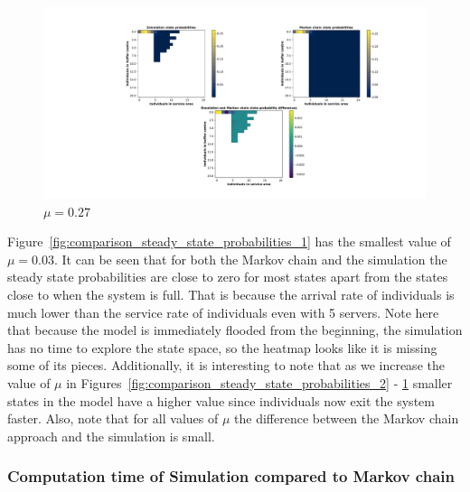 \begin{figure}[H]
    \includegraphics[width=\textwidth, trim=200 60 170 60, clip]{chapters/03_queueing_model/img/numeric_results_and_timings/steady_state_probabilities/main_9.pdf}
    \caption{\(\mu = 0.27\)}
    \label{fig:comparison_steady_state_probabilities_5}
\end{figure}

Figure~\ref{fig:comparison_steady_state_probabilities_1} has the smallest
value of \(\mu = 0.03\).
It can be seen that for both the Markov chain and the simulation the steady
state probabilities are close to zero for most states apart from the
states close to when the system is full.
That is because the arrival rate of individuals is much lower than the service
rate of individuals even with 5 servers.
Note here that because the model is immediately flooded from the beginning, the
simulation has no time to explore the state space, so the heatmap looks like
it is missing some of its pieces.
Additionally, it is interesting to note that as we increase the value of \(\mu\)
in Figures~\ref{fig:comparison_steady_state_probabilities_2} -
\ref{fig:comparison_steady_state_probabilities_5} smaller states in the model
have a higher value since individuals now exit the system faster.
Also, note that for all values of \(\mu\) the difference between the Markov
chain approach and the simulation is small.


\subsubsection{Computation time of Simulation compared to Markov chain }


